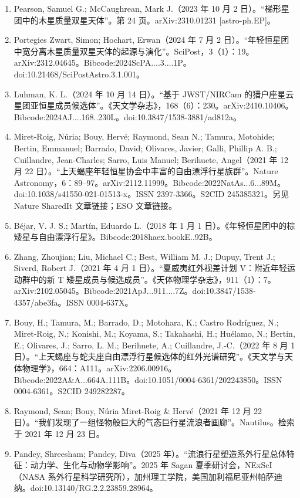 \begin{enumerate}
\item Pearson, Samuel G.; McCaughrean, Mark J.（2023 年 10 月 2 日）。“梯形星团中的木星质量双星天体”。第 24 页。arXiv:2310.01231 [astro-ph.EP]。  
\item Portegies Zwart, Simon; Hochart, Erwan（2024 年 7 月 2 日）。“年轻恒星团中宽分离木星质量双星天体的起源与演化”。SciPost，3（1）：19。arXiv:2312.04645。Bibcode:2024ScPA....3....1P。doi:10.21468/SciPostAstro.3.1.001。  
\item Luhman, K. L.（2024 年 10 月 14 日）。“基于 JWST/NIRCam 的猎户座星云星团亚恒星成员候选体”。《天文学杂志》，168（6）：230。arXiv:2410.10406。Bibcode:2024AJ....168..230L。doi:10.3847/1538-3881/ad812a。  
\item Miret-Roig, Núria; Bouy, Hervé; Raymond, Sean N.; Tamura, Motohide; Bertin, Emmanuel; Barrado, David; Olivares, Javier; Galli, Phillip A. B.; Cuillandre, Jean-Charles; Sarro, Luis Manuel; Berihuete, Angel（2021 年 12 月 22 日）。“上天蝎座年轻恒星协会中丰富的自由漂浮行星族群”。Nature Astronomy，6：89--97。arXiv:2112.11999。Bibcode:2022NatAs...6...89M。doi:10.1038/s41550-021-01513-x。ISSN 2397-3366。S2CID 245385321。另见 Nature SharedIt 文章链接；ESO 文章链接。  
\item Béjar, V. J. S.; Martín, Eduardo L.（2018 年 1 月 1 日）。《年轻恒星团中的棕矮星与自由漂浮行星》。Bibcode:2018haex.bookE..92B。  
\item Zhang, Zhoujian; Liu, Michael C.; Best, William M. J.; Dupuy, Trent J.; Siverd, Robert J.（2021 年 4 月 1 日）。“夏威夷红外视差计划 V：附近年轻运动群中的新 T 矮星成员与候选成员”。《天体物理学杂志》，911（1）：7。arXiv:2102.05045。Bibcode:2021ApJ...911....7Z。doi:10.3847/1538-4357/abe3fa。ISSN 0004-637X。  
\item Bouy, H.; Tamura, M.; Barrado, D.; Motohara, K.; Castro Rodríguez, N.; Miret-Roig, N.; Konishi, M.; Koyama, S.; Takahashi, H.; Huélamo, N.; Bertin, E.; Olivares, J.; Sarro, L. M.; Berihuete, A.; Cuillandre, J.-C.（2022 年 8 月 1 日）。“上天蝎座与蛇夫座自由漂浮行星候选体的红外光谱研究”。《天文学与天体物理学》，664：A111。arXiv:2206.00916。Bibcode:2022A\&A...664A.111B。doi:10.1051/0004-6361/202243850。ISSN 0004-6361。S2CID 249282287。  
\item Raymond, Sean; Bouy, Núria Miret-Roig \& Hervé（2021 年 12 月 22 日）。“我们发现了一组怪物般巨大的气态巨行星流浪者画廊”。Nautilus。检索于 2021 年 12 月 23 日。  
\item Pandey, Shreesham; Pandey, Diva（2025 年）。“流浪行星塑造系外行星总体特征：动力学、生化与动物学影响”。2025 年 Sagan 夏季研讨会，NExScI（NASA 系外行星科学研究所），加州理工学院，美国加利福尼亚州帕萨迪纳。doi:10.13140/RG.2.2.23859.28964。  

\end{enumerate}
